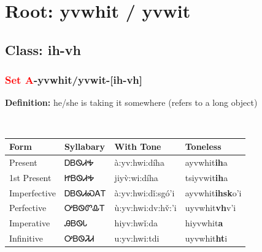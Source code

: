 \needspace{4in}
\section*{Root: yvwhit / yvwit}
\nopagebreak
{}
\needspace{3in}
\subsection*{Class: ih-vh}
\nopagebreak
\needspace{2in}
\subsubsection*{\textcolor{Red}{Set A}{-}\textbf{yvwhit/yvwit}{-}[ih-vh]}
\nopagebreak
\textbf{Definition: } he/she is taking it somewhere (refers to a long object)
\\[0.5em]
\begin{tabularx}{\textwidth}{l X X X}%
\toprule%
\textbf{Form}&\textbf{Syllabary}&\textbf{With Tone}&\textbf{Toneless}\\%
\midrule%
Present&ᎠᏴᏫᏗᎭ&à:yv:hwi:díha&ayvwhit\textbf{ih}a\\%
1st Present&ᏥᏴᏫᏗᎭ&jiyv̀:wi:díha&tsiyvwit\textbf{ih}a\\%
Imperfective&ᎠᏴᏫᏗᏍᎪᎢ&à:yv:hwi:dǐ:sgó’i&ayvwhit\textbf{ihsk}o'i\\%
Perfective&ᎤᏴᏫᏛᎲᎢ&ù:yv:hwi:dv:hv̌:’i&uyvwhit\textbf{vh}v'i\\%
Imperative&ᎯᏴᏫᏓ&hiyv:hwǐ:da&hiyvwhit\textbf{a}\\%
Infinitive&ᎤᏴᏫᏘᏗ&u:yv:hwi:tdi&uyvwhit\textbf{ht}i\\%
\bottomrule%
\end{tabularx}
\\[1em]